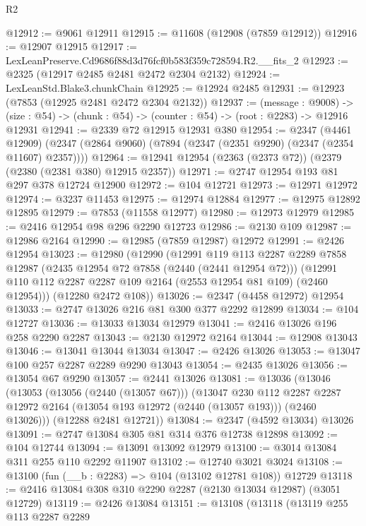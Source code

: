 \begin{lexlean}{R2}
\begin{coremodule}
@12912 := @9061 @12911
@12915 := @11608 (@12908 (@7859 @12912))
@12916 := @12907 @12915
@12917 := LexLeanPreserve.Cd9686f88d3d76fcf0b583f359c728594.R2.__fits_2
@12923 := @2325 (@12917 @2485 @2481 @2472 @2304 @2132)
@12924 := LexLeanStd.Blake3.chunkChain
@12925 := @12924 @2485
@12931 := @12923 (@7853 (@12925 @2481 @2472 @2304 @2132))
@12937 := (message : @9008) ->
  (size : @54) -> (chunk : @54) -> (counter : @54) -> (root : @2283) -> @12916 @12931
@12941 := @2339 @72 @12915 @12931 @380
@12954 := @2347
    (@4461 @12909)
    (@2347 (@2864 @9060) (@7894 (@2347 (@2351 @9290) (@2347 (@2354 @11607) @2357))))
@12964 := @12941 @12954 (@2363 (@2373 @72)) (@2379 (@2380 (@2381 @380) @12915 @2357))
@12971 := @2747 @12954 @193 @81 @297 @378 @12724 @12900
@12972 := @104 @12721
@12973 := @12971 @12972
@12974 := @3237 @11453
@12975 := @12974 @12884
@12977 := @12975 @12892 @12895
@12979 := @7853 (@11558 @12977)
@12980 := @12973 @12979
@12985 := @2416 @12954 @98 @296 @2290 @12723
@12986 := @2130 @109
@12987 := @12986 @2164
@12990 := @12985 (@7859 @12987) @12972
@12991 := @2426 @12954
@13023 := @12980
    (@12990
      (@12991
        @119
        @113
        @2287
        @2289
        @7858
        @12987
        (@2435 @12954 @72 @7858 (@2440 (@2441 @12954 @72)))
        (@12991 @110 @112 @2287 @2287 @109 @2164 (@2553 @12954 @81 @109) (@2460 @12954)))
      (@12280 @2472 @108))
@13026 := @2347 (@4458 @12972) @12954
@13033 := @2747 @13026 @216 @81 @300 @377 @2292 @12899
@13034 := @104 @12727
@13036 := @13033 @13034 @12979
@13041 := @2416 @13026 @196 @258 @2290 @2287
@13043 := @2130 @12972 @2164
@13044 := @12908 @13043
@13046 := @13041 @13044 @13034
@13047 := @2426 @13026
@13053 := @13047 @100 @257 @2287 @2289 @9290 @13043
@13054 := @2435 @13026
@13056 := @13054 @67 @9290
@13057 := @2441 @13026
@13081 := @13036
    (@13046
      (@13053
        (@13056 (@2440 (@13057 @67)))
        (@13047
          @230
          @112
          @2287
          @2287
          @12972
          @2164
          (@13054 @193 @12972 (@2440 (@13057 @193)))
          (@2460 @13026)))
      (@12288 @2481 @12721))
@13084 := @2347 (@4592 @13034) @13026
@13091 := @2747 @13084 @305 @81 @314 @376 @12738 @12898
@13092 := @104 @12744
@13094 := @13091 @13092 @12979
@13100 := @3014 @13084 @311 @255 @110 @2292 @11907
@13102 := @12740 @3021 @3024
@13108 := @13100 (fun (__b : @2283) => @104 (@13102 @12781 @108)) @12729
@13118 := @2416 @13084 @308 @310 @2290 @2287 (@2130 @13034 @12987) (@3051 @12729)
@13119 := @2426 @13084
@13151 := @13108
    (@13118
      (@13119
        @255
        @113
        @2287
        @2289

\end{coremodule}
\end{lexlean}
